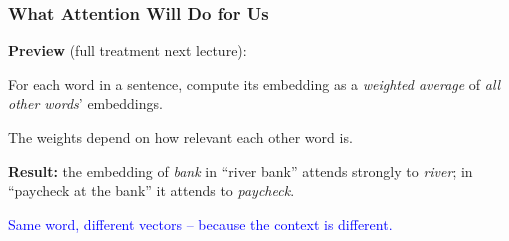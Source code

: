 \documentclass[notes,11pt, aspectratio=169]{beamer}
\newcommand{\vu}{\mathbf{u}}
\newcommand{\vv}{\mathbf{v}}
\newcommand{\vq}{\mathbf{q}}
\newcommand{\vk}{\mathbf{k}}
\begin{document}
\begin{frame}
\frametitle{What Attention Will Do for Us}

\textbf{Preview} (full treatment next lecture):

\vspace{6pt}
For each word in a sentence, compute its embedding as a \emph{weighted average} of \emph{all other words}' embeddings.

\vspace{4pt}
The weights depend on how relevant each other word is.

\vspace{8pt}

\vspace{8pt}
\textbf{Result:} the embedding of \textit{bank} in ``river bank'' attends strongly to \textit{river}; in ``paycheck at the bank'' it attends to \textit{paycheck}.

\vspace{4pt}
\textcolor{blue}{Same word, different vectors -- because the context is different.}
\end{frame}
\end{document}
